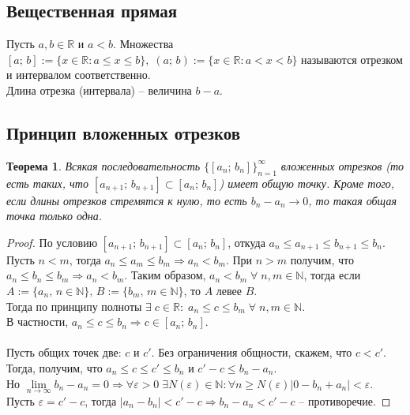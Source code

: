 \documentclass[12pt]{article}
\newtheorem{theorem}{Теорема}%
\theoremstyle{definition}
\begin{document}
\subsection{Вещественная прямая}
Пусть $a, b \in\mathbb{R}$ и $a < b$. Множества $[a;\, b] := \{x\in\mathbb{R}: a \le x \le b\},\; (a;\, b):=\{x\in\mathbb{R}: a < x < b\}$ называются отрезком и интервалом соответственно.\\
Длина отрезка (интервала) -- величина $b - a$. 
\subsection{Принцип вложенных отрезков}
\begin{theorem}
Всякая последовательность $\{[a_n;\, b_n]\}_{n = 1}^\infty$ вложенных отрезков (то есть таких, что $[a_{n + 1};\, b_{n + 1}] \subset [a_n;\, b_n]$) имеет общую точку. Кроме того, если длины отрезков стремятся к нулю, то есть $b_n - a_n \to 0$, то такая общая точка только одна.
\end{theorem}
\begin{proof}
По условию $[a_{n + 1};\, b_{n + 1}] \subset [a_n;\, b_n]$, откуда $a_n \le a_{n + 1} \le b_{n + 1} \le b_n$.\\
Пусть $n < m$, тогда $a_n \le a_m \le b_m \Rightarrow a_n < b_m$. При $n > m$ получим, что $a_n \le b_n \le b_m \Rightarrow a_n < b_m$. Таким образом, $a_n < b_m\;\forall\;n,m\in\mathbb{N}$, тогда если $A:=\{a_n,\,n\in\mathbb{N}\},\,B:=\{b_m,\,m\in\mathbb{N}\}$, то $A$ левее $B$.\\
Тогда по принципу полноты $\exists\;c\in\mathbb{R}:\; a_n \le c \le b_m\;\forall\;n, m\in\mathbb{N}$.\\
В частности, $a_n \le c \le  b_n \Rightarrow c\in[a_n;\, b_n]$.\\
\\
Пусть общих точек две: $c$ и $c'$. Без ограничения общности, скажем, что $c < c'$. \\
Тогда, получим, что $a_n \le c \le c' \le b_n$ и $c' - c \le b_n - a_n$. \\
Но $\lim\limits_{n\to\infty} b_n - a_n = 0 \Rightarrow \forall\varepsilon>0\;\exists N(\varepsilon)\in\mathbb{N}:\forall n\ge N(\varepsilon) \left|0 - b_n + a_n\right| < \varepsilon$. \\
Пусть $\varepsilon = c' - c$, тогда $\left|a_n - b_n\right| < c' - c \Rightarrow b_n - a_n < c' - c$ -- противоречие. 
\end{proof}
\end{document}
